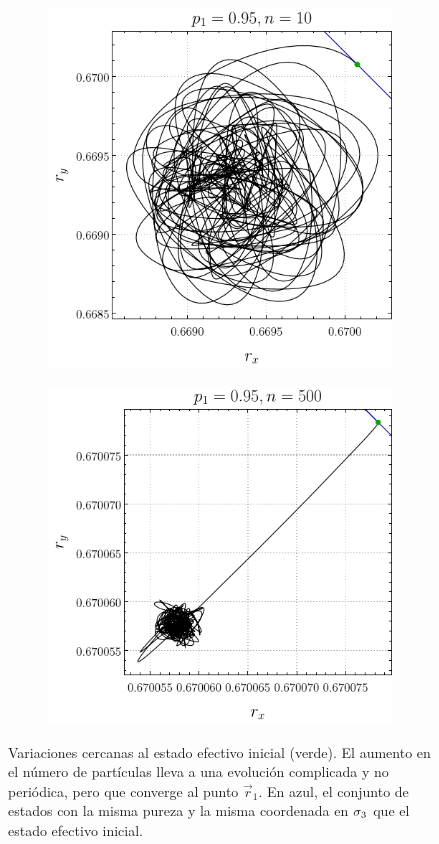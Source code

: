 \begin{figure}[ht!]
    \centering
    \begin{subfigure}{0.5\textwidth}
      \centering
      \includegraphics[width=0.9\linewidth]{chapter3/figures_separable/local_prefinv_ran_n=10_p=0.95_r=0.95_a=-3_b=3.png}
    \end{subfigure}%
    \begin{subfigure}{0.5\textwidth}
      \centering
      \includegraphics[width=0.9\linewidth]{chapter3/figures_separable/local_prefinv_ran_n=500_p=0.95_r=0.95_a=-3_b=3.png}
    \end{subfigure}
    \caption{Variaciones cercanas al estado efectivo inicial (verde). El aumento en el número de partículas lleva a una evolución complicada y no periódica, pero que converge al punto $\vec{r}_{1}$. En azul, el conjunto de estados con la misma pureza y la misma coordenada en $\sigma_{3}$ que el estado efectivo inicial. }\label{fig:PrefInv1}
\end{figure}


